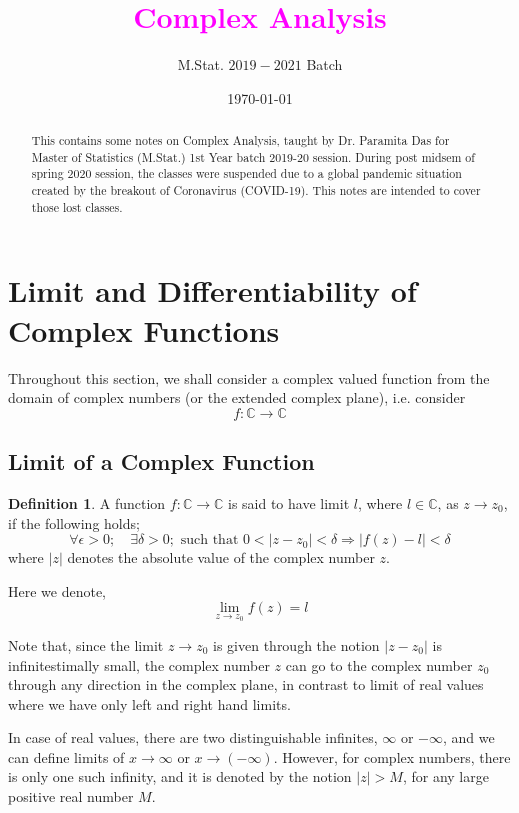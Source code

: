 \documentclass[12pt]{article}
\title{\LARGE \textbf{\textcolor{magenta}{Complex Analysis}}}
\author{M.Stat. $2019-2021$ Batch}
\date{\today}
\newcommand{\C}{\mathbb{C}}
\let\oldsection\section
\renewcommand\section{\clearpage\oldsection}
\theoremstyle{definition}
\newtheorem{defn}{Definition}
\newenvironment{definition}{
\begin{tcolorbox}[colback=green!5!white,colframe=green!75!black, parbox = false]\begin{defn} }{\end{defn}\end{tcolorbox} }
\begin{document}
\maketitle
	
\begin{abstract}
    This contains some notes on Complex Analysis, taught by Dr. Paramita Das for Master of Statistics (M.Stat.) 1st Year batch 2019-20 session. During post midsem of spring $2020$ session, the classes were suspended due to a global pandemic situation created by the breakout of Coronavirus (COVID-19). This notes are intended to cover those lost classes.
\end{abstract}
\pagebreak

\tableofcontents
\pagebreak



\section{Limit and Differentiability of Complex Functions}

Throughout this section, we shall consider a complex valued function from the domain of complex numbers (or the extended complex plane), i.e. consider $$f: \C \rightarrow \C$$

\subsection{Limit of a Complex Function}

\begin{definition}
    A function $f : \C \rightarrow \C$ is said to have limit $l$, where $l \in \C$, as $z \rightarrow z_0$, if the following holds;
    $$\forall \epsilon > 0;\quad \exists \delta > 0; \text{ such that } 0 < \vert z - z_0 \vert < \delta \Rightarrow \vert f(z) - l \vert < \delta$$
    where $\vert z \vert$ denotes the absolute value of the complex number $z$.
    
    Here we denote, $$\lim_{z \rightarrow z_0} f(z) = l$$
\end{definition}

Note that, since the limit $z \rightarrow z_0$ is given through the notion $\vert z - z_0 \vert$ is infinitestimally small, the complex number $z$ can go to the complex number $z_0$ through any direction in the complex plane, in contrast to limit of real values where we have only left and right hand limits. 

In case of real values, there are two distinguishable infinites, $\infty$ or $-\infty$, and we can define limits of $x \rightarrow \infty$ or $x \rightarrow (-\infty)$. However, for complex numbers, there is only one such infinity, and it is denoted by the notion $\vert z \vert > M$, for any large positive real number $M$.
\end{document}
